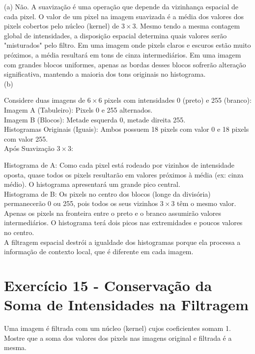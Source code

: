 \documentclass[a4paper,12pt]{article}
\begin{document}
(a)  Não. A suavização é uma operação que depende da vizinhança espacial de cada pixel. O valor de um pixel na imagem suavizada é a média dos valores dos pixels cobertos pelo núcleo (kernel) de $3 \times 3$. Mesmo tendo a mesma contagem global de intensidades, a disposição espacial determina quais valores serão "misturados" pelo filtro. Em uma imagem onde pixels claros e escuros estão muito próximos, a média resultará em tons de cinza intermediários. Em uma imagem com grandes blocos uniformes, apenas as bordas desses blocos sofrerão alteração significativa, mantendo a maioria dos tons originais no histograma.\\


(b) 

Considere duas imagens de $6 \times 6$ pixels com intensidades 0 (preto) e 255 (branco):\\

Imagem A (Tabuleiro): Pixels 0 e 255 alternados.\\
Imagem B (Blocos): Metade esquerda 0, metade direita 255.\\

Histogramas Originais (Iguais): Ambos possuem 18 pixels com valor 0 e 18 pixels com valor 255.\\

Após Suavização $3 \times 3$:

Histograma de A: Como cada pixel está rodeado por vizinhos de intensidade oposta, quase todos os pixels resultarão em valores próximos à média (ex: cinza médio). O histograma apresentará um grande pico central.\\

Histograma de B: Os pixels no centro dos blocos (longe da divisória) permanecerão 0 ou 255, pois todos os seus vizinhos $3 \times 3$ têm o mesmo valor. Apenas os pixels na fronteira entre o preto e o branco assumirão valores intermediários. O histograma terá dois picos nas extremidades e poucos valores no centro.\\

A filtragem espacial destrói a igualdade dos histogramas porque ela processa a informação de contexto local, que é diferente em cada imagem.


\newpage
\section*{Exercício 15 - Conservação da Soma de Intensidades na Filtragem}

Uma imagem é filtrada com um núcleo (kernel) cujos coeficientes somam 1. Mostre que a soma dos
valores dos pixels nas imagens original e filtrada é a mesma.
\end{document}
